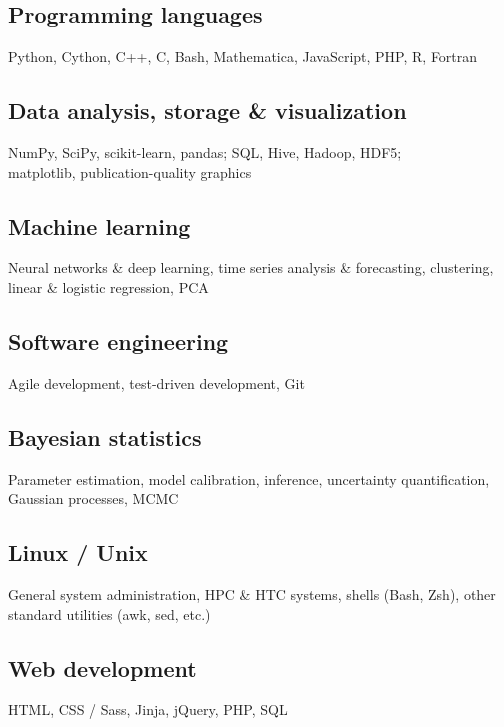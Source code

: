 \documentclass[letterpaper,10pt]{article}
\begin{document}
\begin{multicols}{2}
\subsection{Programming languages}

Python, Cython, C++, C, Bash, Mathematica, JavaScript, PHP, R, Fortran

\subsection{Data analysis, storage \& visualization}

NumPy, SciPy, scikit-learn, pandas; SQL, Hive, Hadoop, HDF5; \\
matplotlib, publication-quality graphics

\subsection{Machine learning}

Neural networks \& deep learning, time series analysis \& forecasting, clustering, linear \& logistic regression, PCA

\subsection{Software engineering}

Agile development, test-driven development, Git

\subsection{Bayesian statistics}

Parameter estimation, model calibration, inference, uncertainty quantification, Gaussian processes, MCMC

\subsection{Linux / Unix}

General system administration, HPC \& HTC systems, shells (Bash, Zsh), other standard utilities (awk, sed, etc.)

\subsection{Web development}

HTML, CSS / Sass, Jinja, jQuery, PHP, SQL


\end{multicols}
\end{document}
